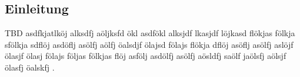 \subsection{Einleitung} \label{sec:Einleitung}
TBD asdfkjatlköj alksdfj  aöljksfd ökl asdfökl alksjdf lkasjdf löjkasd flökjas fölkja sfölkja sdflöj asdöflj asölfj aölfj öalsdjf ölajsd fölajs flökja dflöj asöflj asölfj aslöjf ölasjf ölasj fölajs följas fölkjas flöj asfölj asdölfj asölfj aösldfj saölf jaölsfj aölsjf ölasfj öalskfj .